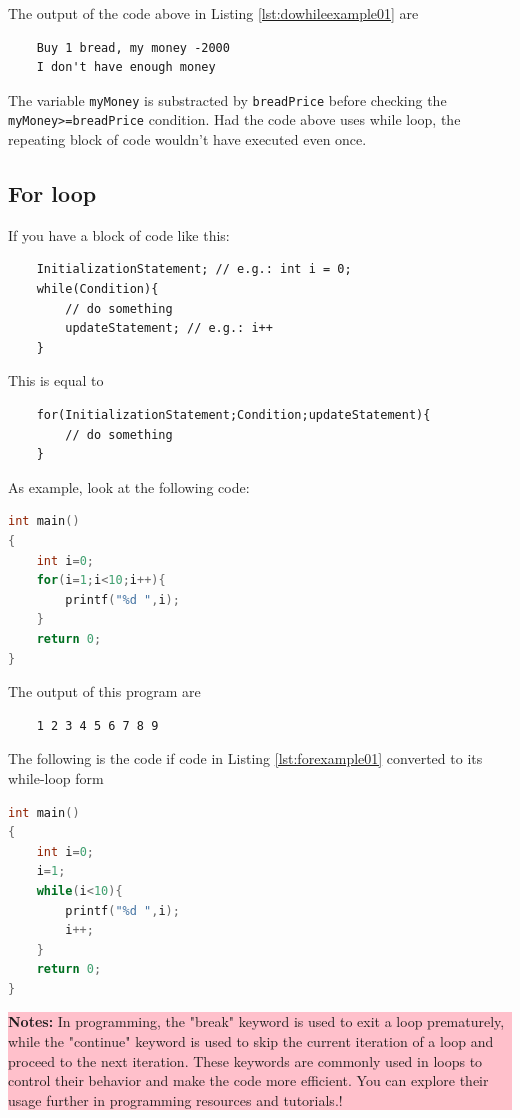 The output of the code above in Listing \ref{lst:dowhileexample01} are
\begin{verbatim}
    Buy 1 bread, my money -2000
    I don't have enough money
\end{verbatim}
The variable \verb|myMoney| is substracted by \verb|breadPrice| before checking the \verb|myMoney>=breadPrice| condition.
Had the code above uses while loop, the repeating block of code wouldn't have executed even once.
\subsection{For loop}
If you have a block of code like this:
\begin{verbatim}
    InitializationStatement; // e.g.: int i = 0;
    while(Condition){
        // do something
        updateStatement; // e.g.: i++ 
    }
\end{verbatim}
This is equal to
\begin{verbatim}
    for(InitializationStatement;Condition;updateStatement){
        // do something
    }
\end{verbatim}

As example, look at the following code:
\begin{lstlisting}[language=c,caption = For implementation example,label=lst:forexample01]
int main()
{
    int i=0;
    for(i=1;i<10;i++){
        printf("%d ",i);
    }
	return 0;
}
\end{lstlisting}
The output of this program are
\begin{verbatim}
    1 2 3 4 5 6 7 8 9 
\end{verbatim}
The following is the code if code in Listing \ref{lst:forexample01} converted to its while-loop form
\begin{lstlisting}[language=c,caption = For in form of while,label=lst:forwhileform01]
int main()
{
    int i=0;
    i=1;
    while(i<10){
        printf("%d ",i);
        i++;
    }
	return 0;
}
\end{lstlisting}
\begin{center}
	\colorbox{pink}{\parbox{0.8\linewidth}{\textbf{Notes:} In programming, the "break" keyword is used to exit a loop prematurely, while the "continue" keyword is used to skip the current iteration of a loop and proceed to the next iteration. These keywords are commonly used in loops to control their behavior and make the code more efficient. You can explore their usage further in programming resources and tutorials.!}}
\end{center}

